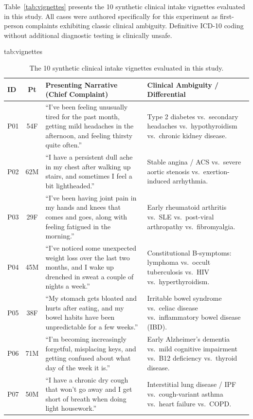 \documentclass[pmlr,twocolumn,10pt]{jmlr} %
\begin{document}
Table~\ref{tab:vignettes} presents the 10 synthetic clinical intake vignettes evaluated in this study. All cases were authored specifically for this experiment as first-person complaints exhibiting classic clinical ambiguity. Definitive ICD-10 coding without additional diagnostic testing is clinically unsafe.

\begin{table}[t]
\floatconts
  {tab:vignettes}%
  {\caption{The 10 synthetic clinical intake vignettes evaluated in this study.}}%
  {\small
  \begin{tabularx}{\textwidth}{@{}lcXp{5.5cm}@{}}
  \toprule
  \textbf{ID} & \textbf{Pt} & \textbf{Presenting Narrative (Chief Complaint)} & \textbf{Clinical Ambiguity / Differential} \\
  \midrule
  P01 & 54F & ``I've been feeling unusually tired for the past month, getting mild headaches in the afternoon, and feeling thirsty quite often.'' & Type 2 diabetes vs.\ secondary headaches vs.\ hypothyroidism vs.\ chronic kidney disease. \\
  P02 & 62M & ``I have a persistent dull ache in my chest after walking up stairs, and sometimes I feel a bit lightheaded.'' & Stable angina / ACS vs.\ severe aortic stenosis vs.\ exertion-induced arrhythmia. \\
  P03 & 29F & ``I've been having joint pain in my hands and knees that comes and goes, along with feeling fatigued in the morning.'' & Early rheumatoid arthritis vs.\ SLE vs.\ post-viral arthropathy vs.\ fibromyalgia. \\
  P04 & 45M & ``I've noticed some unexpected weight loss over the last two months, and I wake up drenched in sweat a couple of nights a week.'' & Constitutional B-symptoms: lymphoma vs.\ occult tuberculosis vs.\ HIV vs.\ hyperthyroidism. \\
  P05 & 38F & ``My stomach gets bloated and hurts after eating, and my bowel habits have been unpredictable for a few weeks.'' & Irritable bowel syndrome vs.\ celiac disease vs.\ inflammatory bowel disease (IBD). \\
  P06 & 71M & ``I'm becoming increasingly forgetful, misplacing keys, and getting confused about what day of the week it is.'' & Early Alzheimer's dementia vs.\ mild cognitive impairment vs.\ B12 deficiency vs.\ thyroid disease. \\
  P07 & 50M & ``I have a chronic dry cough that won't go away and I get short of breath when doing light housework.'' & Interstitial lung disease / IPF vs.\ cough-variant asthma vs.\ heart failure vs.\ COPD. \\

\end{tabularx}}
\end{table}
\end{document}
